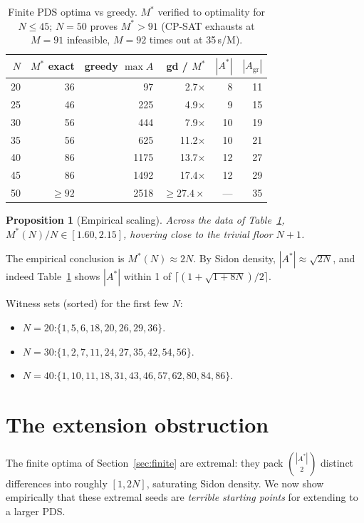 \documentclass[11pt]{article}
\newtheorem{proposition}{Proposition}
\begin{document}
\begin{table}[ht]
\centering
\begin{tabular}{r r r r r r}
\toprule
$N$ & $M^*$ exact & greedy $\max A$ & gd / $M^*$ & $|A^*|$ & $|A_{\text{gr}}|$ \\
\midrule
20 & 36 & 97 & 2.7$\times$ & 8 & 11 \\
25 & 46 & 225 & 4.9$\times$ & 9 & 15 \\
30 & 56 & 444 & 7.9$\times$ & 10 & 19 \\
35 & 56 & 625 & 11.2$\times$ & 10 & 21 \\
40 & 86 & 1175 & 13.7$\times$ & 12 & 27 \\
45 & 86 & 1492 & 17.4$\times$ & 12 & 29 \\
50 & $\geq 92$ & 2518 & $\geq 27.4\times$ & --- & 35 \\
\bottomrule
\end{tabular}
\caption{Finite PDS optima vs greedy. $M^*$ verified to optimality
for $N \leq 45$; $N = 50$ proves $M^* > 91$ (CP-SAT exhausts at $M = 91$
infeasible, $M = 92$ times out at 35\,s/M).}
\label{tab:exact}
\end{table}

\begin{proposition}[Empirical scaling]\label{prop:Mstar}
Across the data of Table~\ref{tab:exact}, $M^*(N)/N \in [1.60, 2.15]$,
hovering close to the trivial floor $N + 1$.
\end{proposition}

The empirical conclusion is $M^*(N) \approx 2N$. By Sidon density,
$|A^*| \approx \sqrt{2 N}$, and indeed Table~\ref{tab:exact} shows
$|A^*|$ within 1 of $\lceil (1+\sqrt{1+8N})/2 \rceil$.

Witness sets (sorted) for the first few $N$:
\begin{itemize}
\item $N = 20$:\quad $\{1, 5, 6, 18, 20, 26, 29, 36\}$.
\item $N = 30$:\quad $\{1, 2, 7, 11, 24, 27, 35, 42, 54, 56\}$.
\item $N = 40$:\quad $\{1, 10, 11, 18, 31, 43, 46, 57, 62, 80, 84, 86\}$.
\end{itemize}

\section{The extension obstruction}\label{sec:ext}

The finite optima of Section~\ref{sec:finite} are extremal: they pack
$\binom{|A^*|}{2}$ distinct differences into roughly $[1, 2N]$,
saturating Sidon density. We now show empirically that these extremal
seeds are \emph{terrible starting points} for extending to a larger
PDS.
\end{document}
